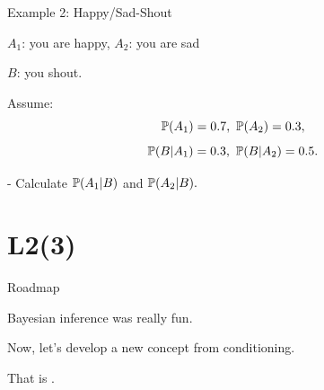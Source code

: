 \documentclass[fleqn,aspectratio=169]{beamer}
\begin{document}
\begin{frame}{Example 2: Happy/Sad-Shout}

{
\plitemsep 0.1in
\bci 

\item $A_1$: you are happy, $A_2$: you are sad
\item $B$: you shout. 

\item Assume: 
$$
\cprob{A_1}=0.7, \ \cprob{A_2}=0.3,
$$
$$
\mathbb{P}( B | A_1 ) = 0.3, \ \mathbb{P}( B | A_2 )=0.5.
$$

\eci 
}
{
\medskip

- Calculate $\mathbb{P}( A_1 | B )$ and $\mathbb{P}( A_2 | B ).$


}

 

\end{frame}


\section{L2(3)}
\begin{frame}{Roadmap}

\bce[(1)]
\item {}

\item {}

\item {}

\ece
\end{frame}



\begin{frame}{}
\vspace{2cm}
\LARGE Bayesian inference was really fun. 

\medskip

Now, let's develop a new concept from conditioning. 

\medskip

\LARGE That is . 

\end{frame}
\end{document}
